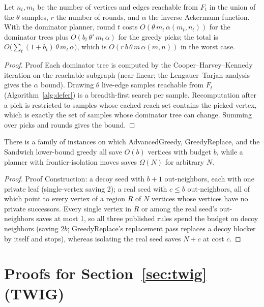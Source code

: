 \documentclass[ijoc,sglanonrev]{informs4}
\begin{document}
\begin{repeattheorem}
Let $n_t,m_t$ be the number of vertices and edges reachable from $F_t$ in
the union of the $\theta$ samples, $r$ the number of rounds, and $\alpha$
the inverse Ackermann function. With the dominator planner, round $t$
costs $O(\theta\,m_t\,\alpha(m_t,n_t))$ for the dominator trees plus
$O(b_t\,\theta'\,m_t\,\alpha)$ for the greedy picks; the total is
$O\bigl(\sum_t(1+b_t)\,\theta\,m_t\,\alpha\bigr)$, which is
$O(r\,b\,\theta\,m\,\alpha(m,n))$ in the worst case.
\end{repeattheorem}
\begin{proof}{Proof}
Each dominator tree is computed by the Cooper--Harvey--Kennedy iteration
on the reachable subgraph (near-linear; the Lengauer--Tarjan analysis gives
the $\alpha$ bound). Drawing $\theta$ live-edge samples reachable from
$F_t$ (Algorithm~\ref{alg:defer}) is a breadth-first search per sample. Recomputation after a pick is restricted to samples
whose cached reach set contains the picked vertex, which is exactly the
set of samples whose dominator tree can change. Summing over picks and
rounds gives the bound.\Halmos
\end{proof}

\begin{repeattheorem}
There is a family of instances on which AdvancedGreedy, GreedyReplace, and
the Sandwich lower-bound greedy all save $O(b)$ vertices with budget $b$,
while a planner with frontier-isolation moves saves $\Omega(N)$ for
arbitrary $N$.
\end{repeattheorem}
\begin{proof}{Proof}
Construction: a decoy seed with $b+1$ out-neighbors, each with one private
leaf (single-vertex saving 2); a real seed with $c\le b$ out-neighbors, all
of which point to every vertex of a region $R$ of $N$ vertices whose
vertices have no private successors. Every single vertex in $R$ or among
the real seed's out-neighbors saves at most 1, so all three published
rules spend the budget on decoy neighbors (saving $2b$; GreedyReplace's
replacement pass replaces a decoy blocker by itself and stops), whereas
isolating the real seed saves $N+c$ at cost $c$.\Halmos
\end{proof}

\section{Proofs for Section~\ref{sec:twig} (TWIG)}\label{ec:twig-proofs}
\end{document}
